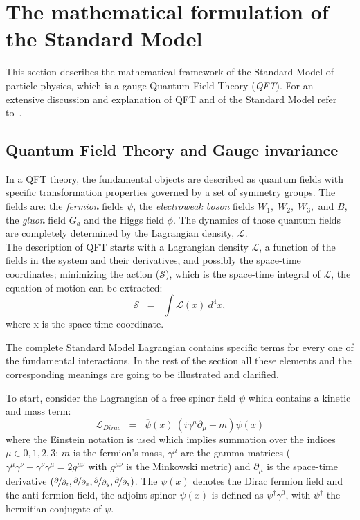\section{The mathematical formulation of the Standard Model}\label{sec:mathSM}
This section describes the mathematical framework of the Standard Model of particle physics, which is a gauge Quantum Field Theory (\emph{QFT}). For an extensive discussion and explanation of QFT and of the Standard Model refer to~\cite{Bardin:1999ak}.
\subsection{Quantum Field Theory and Gauge invariance}\label{sec:qft}
In a QFT theory, the fundamental objects are described as quantum fields with specific transformation properties governed by a set of symmetry groups. The fields are: the \emph{fermion} fields $\psi$, the \emph{electroweak boson} fields $W_1, \; W_2, \; W_3,$ and $B$, the \emph{gluon} field $G_a$ and the Higgs field $\phi$. The dynamics of those quantum fields are completely determined by the Lagrangian density, $\mathcal{L}$. \\
The description of QFT starts with a Lagrangian density $\mathcal{L}$, a function of the fields in the system and their derivatives, and possibly the space-time coordinates; minimizing the action ($\mathcal{S}$), which is the space-time integral of $\mathcal{L}$, the equation of motion can be extracted:
\begin{equation}
\label{eq:action}
 \mathcal{S} \;\; = \;\; \int \mathcal{L}(x) \ d^4x,
\end{equation}
where x is the space-time coordinate.

The complete Standard Model Lagrangian contains specific terms for every one of the fundamental interactions. In the rest of the section all these elements and the corresponding meanings are going to be illustrated and clarified.

To start, consider the Lagrangian of a free spinor field $\psi$ which contains a kinetic and mass term:
\begin{equation}
\label{eq:dirac}
 \mathcal{L}_{Dirac} \;\; = \;\; \overline{\psi}(x)\ (i\gamma^{\mu}\partial_{\mu} - m ) \psi(x)
\end{equation}
where the Einstein notation is used which implies summation over the indices $\mu \in 0,1,2,3$; $m$ is the fermion's mass, $\gamma^{\mu}$ are the gamma matrices ($\gamma^{\mu}\gamma^{\nu} + \gamma^{\nu}\gamma^{\mu} = 2g^{\mu\nu}$ with $g^{\mu\nu}$ is the Minkowski metric) and $\partial_{\mu}$ is the space-time derivative $(\nicefrac{\partial}{\partial_{t}}, \nicefrac{\partial}{\partial_{x}}, \nicefrac{\partial}{\partial_{y}}, \nicefrac{\partial}{\partial_{z}})$. The $\psi(x)$ denotes the Dirac fermion field and the anti-fermion field, the adjoint spinor $\overline{\psi}(x)$ is defined as $\psi^\dag\gamma^{0}$, with $\psi^\dag$ the hermitian conjugate of $\psi$.

